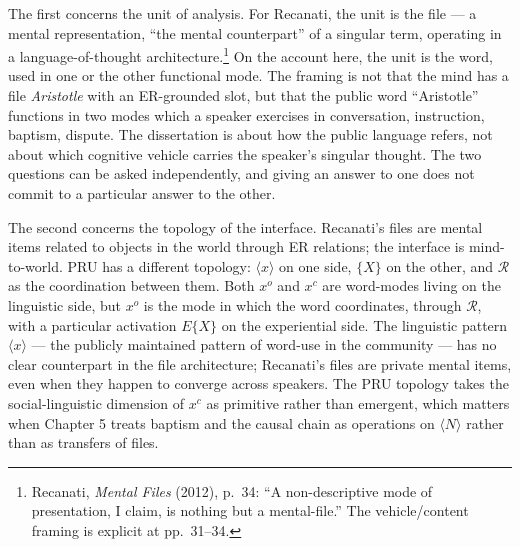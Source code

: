 \documentclass[12pt,a4paper]{article}
\begin{document}
The first concerns the unit of analysis. For Recanati, the unit is the file --- a mental representation, ``the mental counterpart'' of a singular term, operating in a language-of-thought architecture.\footnote{Recanati, \emph{Mental Files} (2012), p.~34: ``A non-descriptive mode of presentation, I claim, is nothing but a mental-file.'' The vehicle/content framing is explicit at pp.~31--34.} On the account here, the unit is the word, used in one or the other functional mode. The framing is not that the mind has a file \emph{Aristotle} with an ER-grounded slot, but that the public word ``Aristotle'' functions in two modes which a speaker exercises in conversation, instruction, baptism, dispute. The dissertation is about how the public language refers, not about which cognitive vehicle carries the speaker's singular thought. The two questions can be asked independently, and giving an answer to one does not commit to a particular answer to the other.

The second concerns the topology of the interface. Recanati's files are mental items related to objects in the world through ER relations; the interface is mind-to-world. PRU has a different topology: \(\langle x \rangle\) on one side, \(\{X\}\) on the other, and \(\mathcal{R}\) as the coordination between them. Both \(x^o\) and \(x^c\) are word-modes living on the linguistic side, but \(x^o\) is the mode in which the word coordinates, through \(\mathcal{R}\), with a particular activation \(E\{X\}\) on the experiential side. The linguistic pattern \(\langle x \rangle\) --- the publicly maintained pattern of word-use in the community --- has no clear counterpart in the file architecture; Recanati's files are private mental items, even when they happen to converge across speakers. The PRU topology takes the social-linguistic dimension of \(x^c\) as primitive rather than emergent, which matters when Chapter 5 treats baptism and the causal chain as operations on \(\langle N \rangle\) rather than as transfers of files.
\end{document}
